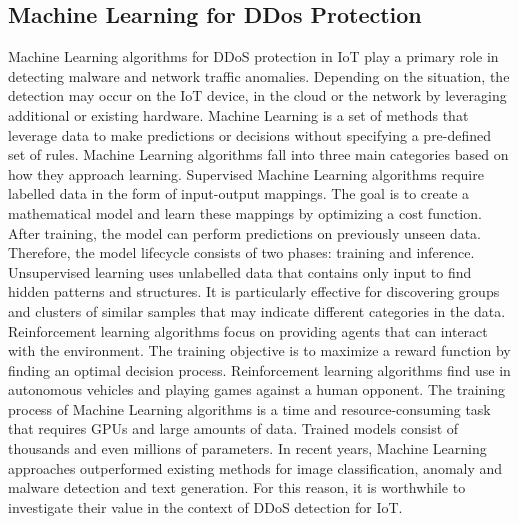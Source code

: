 \documentclass[conference, 11pt]{IEEEtran}
\begin{document}
\subsection{Machine Learning for DDos Protection}
Machine Learning algorithms for DDoS protection in IoT play a primary role in detecting malware and network traffic anomalies.
Depending on the situation, the detection may occur on the IoT device, in the cloud or the network by leveraging additional or existing hardware.
Machine Learning is a set of methods that leverage data to make predictions or decisions without specifying a pre-defined set of rules.
Machine Learning algorithms fall into three main categories based on how they approach learning. Supervised Machine Learning algorithms require labelled data in the form of input-output mappings.
The goal is to create a mathematical model and learn these mappings by optimizing a cost function.
After training, the model can perform predictions on previously unseen data.
Therefore, the model lifecycle consists of two phases: training and inference.
Unsupervised learning uses unlabelled data that contains only input to find hidden patterns and structures.
It is particularly effective for discovering groups and clusters of similar samples that may indicate different categories in the data.
Reinforcement learning algorithms focus on providing agents that can interact with the environment.
The training objective is to maximize a reward function by finding an optimal decision process.
Reinforcement learning algorithms find use in autonomous vehicles and playing games against a human opponent.
The training process of Machine Learning algorithms is a time and resource-consuming task that requires GPUs and large amounts of data.
Trained models consist of thousands and even millions of parameters.
In recent years, Machine Learning approaches outperformed existing methods for image classification, anomaly and malware detection and text generation.
For this reason, it is worthwhile to investigate their value in the context of DDoS detection for IoT.
\end{document}
